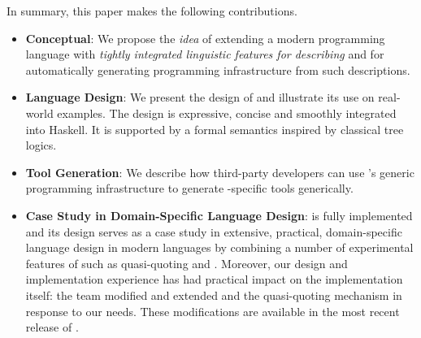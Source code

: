 In summary, this paper makes the following contributions.
\begin{itemize}
\item {\bf Conceptual}:  We propose the {\em idea} 
of extending a modern programming language with
{\em tightly integrated linguistic features for describing \filestores{}}
and for automatically generating programming infrastructure from such 
descriptions.

\item {\bf Language Design}: We present the design of \forest{}
  and illustrate its use on real-world examples.
  The design is expressive, concise and smoothly integrated into
  Haskell.  It is supported by a formal semantics inspired by classical tree logics.

\item {\bf Tool Generation}: We describe how third-party developers
  can use \haskell{}'s generic programming infrastructure to generate
  \filestore{}-specific tools generically.

\item {\bf Case Study in Domain-Specific Language Design}: \forest{}
  is fully implemented and its design serves
  as a case study in extensive, practical, domain-specific
  language design in modern languages by combining a number of
  experimental features of \haskell{} such as quasi-quoting and \template{}.
  Moreover, our \forest{} design and implementation experience 
  has had practical impact on the \haskell{} implementation itself:  
  the \haskell{} team modified and extended \template{} and the
  quasi-quoting mechanism in response
  to our needs.  These modifications
  are available in the most recent release of \haskell{}.
\end{itemize}



